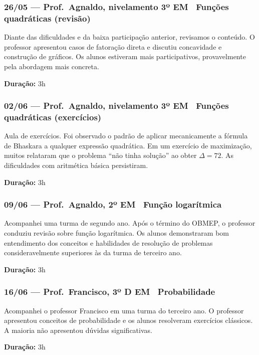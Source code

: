 \documentclass[11pt]{article}
\begin{document}
\subsubsection*{26/05 --- Prof.\ Agnaldo, nivelamento 3º EM \textbar\ Funções quadráticas (revisão)}

Diante das dificuldades e da baixa participação anterior, revisamos o conteúdo. O professor apresentou casos de fatoração direta e discutiu concavidade e construção de gráficos. Os alunos estiveram mais participativos, provavelmente pela abordagem mais concreta.

\textbf{Duração:} 3h

\subsubsection*{02/06 --- Prof.\ Agnaldo, nivelamento 3º EM \textbar\ Funções quadráticas (exercícios)}

Aula de exercícios. Foi observado o padrão de aplicar mecanicamente a fórmula de Bhaskara a qualquer expressão quadrática. Em um exercício de maximização, muitos relataram que o problema ``não tinha solução'' ao obter \(\Delta = 72\). As dificuldades com aritmética básica persistiram.

\textbf{Duração:} 3h

\subsubsection*{09/06 --- Prof.\ Agnaldo, 2º EM \textbar\ Função logarítmica}

Acompanhei uma turma de segundo ano. Após o término do OBMEP, o professor conduziu revisão sobre função logarítmica. Os alunos demonstraram bom entendimento dos conceitos e habilidades de resolução de problemas consideravelmente superiores às da turma de terceiro ano.

\textbf{Duração:} 3h

\subsubsection*{16/06 --- Prof.\ Francisco, 3º D EM \textbar\ Probabilidade}

Acompanhei o professor Francisco em uma turma do terceiro ano. O professor apresentou conceitos de probabilidade e os alunos resolveram exercícios clássicos. A maioria não apresentou dúvidas significativas.

\textbf{Duração:} 3h
\end{document}
